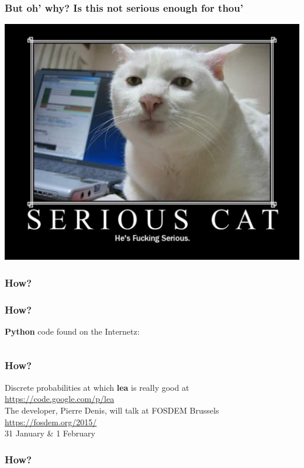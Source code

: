 \documentclass[a4paper]{beamer}
\begin{document}
\begin{frame}
\frametitle{But oh' why? Is this not serious enough for thou'} 
\includegraphics[scale=0.21]{img/serious-cat.jpg}
\end{frame}

\begin{frame}
\frametitle{How?} 

\end{frame}

\begin{frame}
\frametitle{How?} 

{\bf Python} code found on the Internetz:

\inputminted[firstline=1, lastline=15, gobble=0, linenos, mathescape, bgcolor=bg, numbersep=8pt, frame=lines, framesep=3mm, fontsize=\scriptsize]{python}{code/bullshit_generator.py}
\end{frame}

\begin{frame}
\frametitle{How?} 
Discrete probabilities
at which {\bf lea} is really good at
\url{https://code.google.com/p/lea}
\\

The developer, Pierre Denis, will talk at FOSDEM Brussels
\\

\url{https://fosdem.org/2015/}
\\

31 January \& 1 February
\end{frame}


\begin{frame}
\frametitle{How?} 

\inputminted[firstline=13, lastline=15, gobble=0, linenos, mathescape, bgcolor=bg, numbersep=8pt, frame=lines, framesep=3mm, fontsize=\scriptsize]{python}{code/bullshit_generator.py}

\inputminted[firstline=71, lastline=79, gobble=0, linenos, mathescape, bgcolor=bg, numbersep=8pt, frame=lines, framesep=3mm, fontsize=\scriptsize]{python}{code/bullshit_generator.py}

\end{frame}
\end{document}
